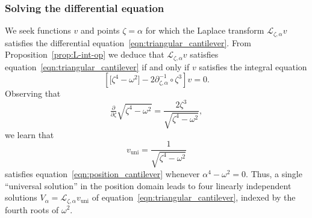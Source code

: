 \documentclass{article}
\newcommand{\fracderiv}[3]{\partial^{#1}_{#2, #3}}
\newcommand{\laplace}{\mathcal{L}}
\theoremstyle{definition}
\theoremstyle{plain}
\begin{document}
\subsubsection{Solving the differential equation}\label{sec:solve-cantilever-eqn}
We seek functions $v$ and points $\zeta = \alpha$ for which the Laplace transform $\laplace_{\zeta, \alpha} v$ satisfies the differential equation~\eqref{eqn:triangular_cantilever}. From Proposition~\ref{prop:L-int-op} we deduce that $\laplace_{\zeta, \alpha} v$ satisfies equation~\eqref{eqn:triangular_cantilever} if and only if $v$ satisfies the integral equation
\begin{equation}\label{eqn:position_cantilever}
\left[ \big[ \zeta^4 - \omega^2 \big] - 2\fracderiv{-1}{\zeta}{\alpha} \circ \zeta^3 \right] v = 0.
\end{equation}
Observing that
\[ \tfrac{\partial}{\partial \zeta} \sqrt{\zeta^4 - \omega^2} = \frac{2\zeta^3}{\sqrt{\zeta^4 - \omega^2}}, \]
we learn that
\begin{equation}
v_\text{uni} = \frac{1}{\sqrt{\zeta^4 - \omega^2}}
\end{equation}
satisfies equation~\eqref{eqn:position_cantilever} whenever $\alpha^4 - \omega^2 = 0$. Thus, a single ``universal solution'' in the position domain leads to four linearly independent solutions $V_\alpha = \laplace_{\zeta, \alpha} v_\text{uni}$ of equation~\eqref{eqn:triangular_cantilever}, indexed by the fourth roots of $\omega^2$.
\end{document}
